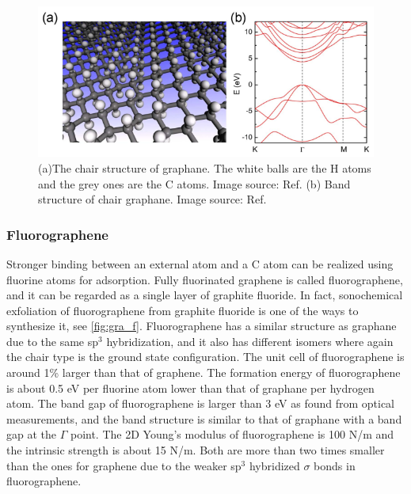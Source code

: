 \begin{figure}[htbp!] 
\centering  
\includegraphics[width=1\textwidth]{graphane.eps}
\caption[Atomic and electronic structure of graphane]{(a)The chair structure of graphane. The white balls are the H atoms and the grey ones are the C atoms. Image source: Ref. \cite{Sofo2007} (b) Band structure of chair graphane. Image source: Ref. \cite{leenaerts2010}}  
\label{fig:gra_h}
\end{figure} 

\subsubsection{Fluorographene}

Stronger binding between an external atom and a C atom can be realized using fluorine atoms for adsorption. Fully fluorinated graphene is called fluorographene, and it can be regarded as a single layer of graphite fluoride. In fact, sonochemical exfoliation of fluorographene from graphite fluoride is one of the ways to synthesize it, see \autoref{fig:gra_f}\cite{Zhu2013}. Fluorographene has a similar structure as graphane due to the same sp$^3$ hybridization, and it also has different isomers where again the chair type is the ground state configuration\cite{samarakoon2011}. The unit cell of fluorographene is around 1\% larger than that of graphene\cite{nair2010}. The formation energy of fluorographene is about 0.5 eV per fluorine atom lower than that of graphane per hydrogen atom\cite{Jeon2011}. The band gap of fluorographene is larger than 3 eV as found from optical measurements\cite{nair2010,Jeon2011}, and the band structure is similar to that of graphane with a band gap at the $\Gamma$ point. The 2D Young's modulus of fluorographene is 100 \si{N/m} and the intrinsic strength is about 15 \si{N/m}. Both are more than two times smaller than the ones for graphene due to the weaker sp$^3$ hybridized $\sigma$ bonds in fluorographene\cite{nair2010}.

